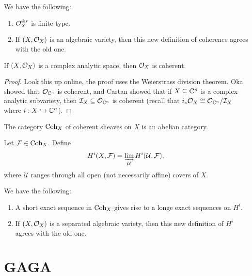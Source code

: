 \begin{example}
  We have the following:
  \begin{enumerate}
    \item $\mathcal{O}_X^{\oplus r}$ is finite type.
    \item If $(X, \mathcal{O}_X)$ is an algebraic
      variety, then this new definition of
      coherence agrees with
      the old one.
  \end{enumerate}
\end{example}

\begin{theorem}\label{thm:oka-cartan}
  If $(X, \mathcal{O}_X)$ is a complex analytic
  space, then $\mathcal{O}_X$ is coherent.
\end{theorem}

\begin{proof}
  Look this up online, the proof uses
  the Weierstrass division theorem.
  Oka showed that $\mathcal{O}_{\mathbb{C}^n}$ is coherent,
  and Cartan showed that if $X \subseteq \mathbb{C}^n$
  is a complex analytic subvariety, then
  $\mathcal{I}_X \subseteq \mathcal{O}_{\mathbb{C}^n}$ is
  coherent (recall that $i_* \mathcal{O}_X \cong \mathcal{O}_{\mathbb{C}^n}/\mathcal{I}_X$ where $i : X \hookrightarrow \mathbb{C}^n$).
\end{proof}

\begin{remark}
  The category $\operatorname{Coh}_X$ of
  coherent sheaves on $X$ is an abelian
  category.
\end{remark}

\begin{definition}
  Let $\mathcal{F} \in \operatorname{Coh}_X$. Define
  \[
    H^i(X, \mathcal{F})
    = \varinjlim_{\mathcal{U}} H^i(\mathcal{U}, \mathcal{F}),
  \]
  where $\mathcal{U}$ ranges through all
  open (not necessarily affine) covers of $X$.
\end{definition}

\begin{remark}
  We have the following:
  \pagebreak
  \begin{enumerate}
    \item A short exact sequence in
      $\operatorname{Coh}_X$ gives rise to a longe
      exact sequences on $H^i$.
    \item If $(X, \mathcal{O}_X)$ is a separated
      algebraic variety, then this new definition of
      $H^i$ agrees with the old one.
  \end{enumerate}
\end{remark}

\section{GAGA}

